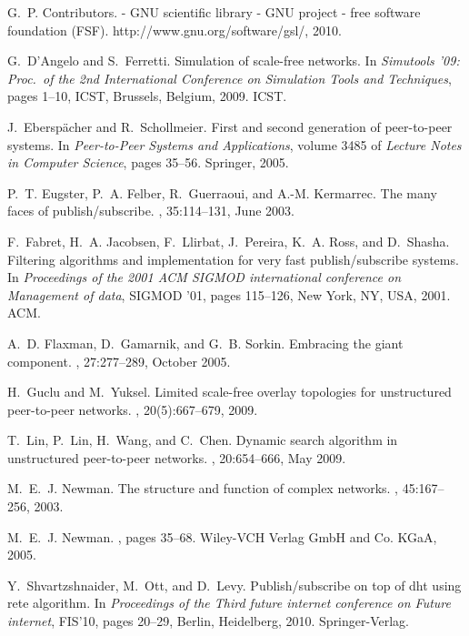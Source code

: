 \documentclass[10pt, conference, compsocconf]{IEEEtran}
\begin{document}
\begin{thebibliography}{10}
G.~P. Contributors.
 - {GNU} scientific library - {GNU} project - free software
  foundation {(FSF)}.
\newblock http://www.gnu.org/software/gsl/, 2010.

G.~D'Angelo and S.~Ferretti.
\newblock Simulation of scale-free networks.
\newblock In {\em Simutools '09: Proc.~of the 2nd International Conference on
  Simulation Tools and Techniques}, pages 1--10, ICST, Brussels, Belgium, 2009.
  ICST.

J.~Eberspächer and R.~Schollmeier.
\newblock First and second generation of peer-to-peer systems.
\newblock In {\em Peer-to-Peer Systems and Applications}, volume 3485 of {\em
  Lecture Notes in Computer Science}, pages 35--56. Springer, 2005.

P.~T. Eugster, P.~A. Felber, R.~Guerraoui, and A.-M. Kermarrec.
\newblock The many faces of publish/subscribe.
, 35:114--131, June 2003.

F.~Fabret, H.~A. Jacobsen, F.~Llirbat, J.~Pereira, K.~A. Ross, and D.~Shasha.
\newblock Filtering algorithms and implementation for very fast
  publish/subscribe systems.
\newblock In {\em Proceedings of the 2001 ACM SIGMOD international conference
  on Management of data}, SIGMOD '01, pages 115--126, New York, NY, USA, 2001.
  ACM.

A.~D. Flaxman, D.~Gamarnik, and G.~B. Sorkin.
\newblock Embracing the giant component.
, 27:277--289, October 2005.

H.~Guclu and M.~Yuksel.
\newblock Limited scale-free overlay topologies for unstructured peer-to-peer
  networks.
, 20(5):667--679, 2009.

T.~Lin, P.~Lin, H.~Wang, and C.~Chen.
\newblock Dynamic search algorithm in unstructured peer-to-peer networks.
, 20:654--666, May 2009.

M.~E.~J. Newman.
\newblock The structure and function of complex networks.
, 45:167--256, 2003.

M.~E.~J. Newman.
, pages 35--68.
\newblock Wiley-VCH Verlag GmbH and Co. KGaA, 2005.

Y.~Shvartzshnaider, M.~Ott, and D.~Levy.
\newblock Publish/subscribe on top of dht using rete algorithm.
\newblock In {\em Proceedings of the Third future internet conference on Future
  internet}, FIS'10, pages 20--29, Berlin, Heidelberg, 2010. Springer-Verlag.


\end{thebibliography}
\end{document}
